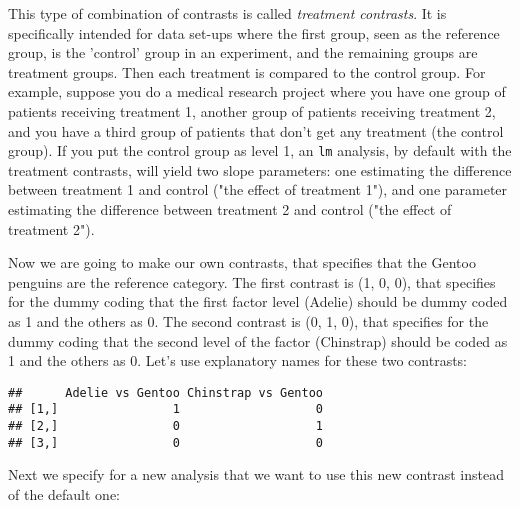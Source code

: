 This type of combination of contrasts is called \textit{treatment contrasts}. It is specifically intended for data set-ups where the first group, seen as the reference group, is the 'control' group in an experiment, and the remaining groups are treatment groups. Then each treatment is compared to the control group. For example, suppose you do a medical research project where you have one group of patients receiving treatment 1, another group of patients receiving treatment 2, and you have a third group of patients that don't get any treatment (the control group). If you put the control group as level 1, an \texttt{lm} analysis, by default with the treatment contrasts, will yield two slope parameters: one estimating the difference between treatment 1 and control ("the effect of treatment 1"), and one parameter estimating the difference between treatment 2 and control ("the effect of treatment 2").

Now we are going to make our own contrasts, that specifies that the Gentoo penguins are the reference category. The first contrast is (1, 0, 0), that specifies for the dummy coding that the first factor level (Adelie) should be dummy coded as 1 and the others as 0. The second contrast is (0, 1, 0), that specifies for the dummy coding that the second level of the factor (Chinstrap) should be coded as 1 and the others as 0. Let's use explanatory names for these two contrasts:

\begin{knitrout}
\color{fgcolor}\begin{kframe}
\begin{alltt}
 \hlkwb{<-} \hlstd{(} \hlstd{=} \hlstd{(}\hlstd{,} \hlstd{,} \hlstd{),}
                        \hlstd{=} \hlstd{(}\hlstd{,}  \hlstd{,}\hlstd{))}
\end{alltt}
\begin{verbatim}
##      Adelie vs Gentoo Chinstrap vs Gentoo
## [1,]                1                   0
## [2,]                0                   1
## [3,]                0                   0
\end{verbatim}
\end{kframe}
\end{knitrout}

Next we specify for a new analysis that we want to use this new contrast instead of the default one:

